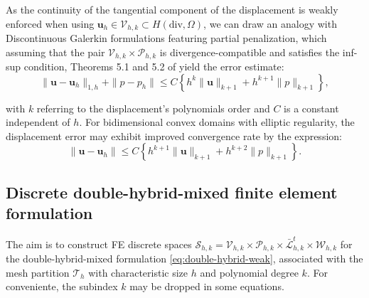 \documentclass[english,11pt,3p,number,sort&compress]{elsarticle}
\begin{document}
As the continuity of the tangential component of the displacement is weakly enforced when using $\bm{u}_h \in \mathcal{V}_{h,k} \subset H(\text{div},\Omega)$, we can draw an analogy with Discontinuous Galerkin formulations featuring partial penalization, which assuming that the pair $\mathcal{V}_{h,k} \times \mathcal{P}_{h,k}$ is divergence-compatible and satisfies the inf-sup condition, Theorems 5.1 and 5.2 of \cite{wang2007new} yield the error estimate:
\begin{equation}
\|\mathbf{u} - \mathbf{u}_h\|_{1,h} + \|p - p_h\| \leq C \left\{ h^k \|\mathbf{u}\|_{k+1} + h^{k+1} \|p\|_{k+1} \right\},
\end{equation}

\noindent with $k$ referring to the displacement's polynomials order and $C$ is a constant independent of $h$. For bidimensional convex domains with elliptic regularity, the displacement error may exhibit improved convergence rate by the expression:
\begin{equation}
\|\mathbf{u} - \mathbf{u}_h\| \leq C \left\{ h^{k+1} \|\mathbf{u}\|_{k+1} + h^{k+2} \|p\|_{k+1} \right\}.
\end{equation}

\subsection{Discrete double-hybrid-mixed finite element formulation}

The aim is to construct FE discrete spaces $\mathcal{S}_{h,k}=\mathcal{V}_{h,k} \times \mathcal{P}_{h,k} \times \bar{\mathcal{L}}^t_{h,k} \times \mathcal{W}_{h,k}$ for the double-hybrid-mixed formulation \eqref{eq:double-hybrid-weak}, associated with the mesh partition $\mathcal{T}_h$ with characteristic size $h$ and polynomial degree $k$. For conveniente, the subindex $k$ may be dropped in some equations.
\end{document}

